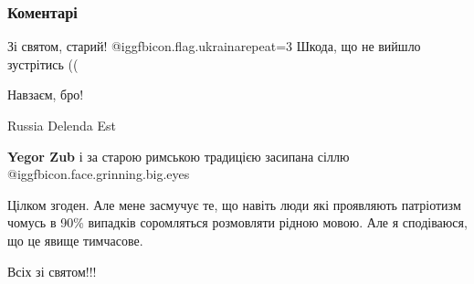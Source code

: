  
 
 
 
 
\subsubsection{Коментарі}
\label{sec:24_08_2019.fb.gavrilenko_oleg.1.nezalezhnist_ugroza_moskovia.cmt}

\begin{itemize}
 
Зі святом, старий! @igg{fbicon.flag.ukraina}{repeat=3} Шкода, що не вийшло зустрітись ((

 
Навзаєм, бро!

 
Russia Delenda Est

 
\textbf{Yegor Zub} і за старою римською традицією засипана сіллю @igg{fbicon.face.grinning.big.eyes} 

 

Цілком згоден. Але мене засмучує те, що навіть люди які проявляють патріотизм
чомусь в 90\% випадків соромляться розмовляти рідною мовою. Але я сподіваюся,
що це явище тимчасове.

Всіх зі святом!!!

\end{itemize}

